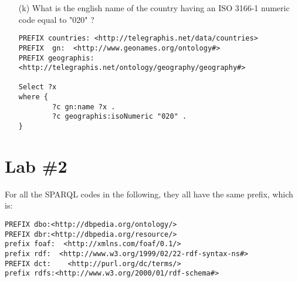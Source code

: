 \documentclass[a4paper, 12pt]{report}
\begin{document}
\begin{enumerate}
\begin{lstlisting}[frame=single]
}

\end{lstlisting}

\item[(k)] What is the english name of the country having an ISO 3166-1 numeric code equal to "020" ?
\begin{lstlisting}[frame=single]
PREFIX countries: <http://telegraphis.net/data/countries>
PREFIX  gn:  <http://www.geonames.org/ontology#>
PREFIX geographis:  <http://telegraphis.net/ontology/geography/geography#>

Select ?x
where {
        ?c gn:name ?x .
        ?c geographis:isoNumeric "020" .
}
\end{lstlisting}
\end{enumerate}

\chapter{Lab \#2}
For all the SPARQL codes in the following, they all have the same prefix, which is:
\begin{lstlisting}[frame=single]
PREFIX dbo:<http://dbpedia.org/ontology/>
PREFIX dbr:<http://dbpedia.org/resource/>
prefix foaf:  <http://xmlns.com/foaf/0.1/>
prefix rdf:  <http://www.w3.org/1999/02/22-rdf-syntax-ns#>
PREFIX dct:    <http://purl.org/dc/terms/>
prefix rdfs:<http://www.w3.org/2000/01/rdf-schema#>
\end{lstlisting}
\end{document}
